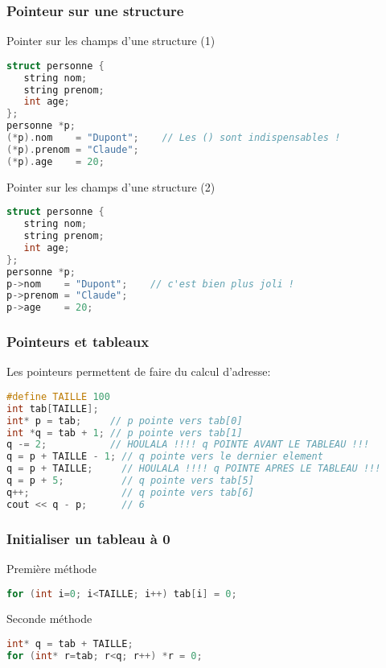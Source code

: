\documentclass{beamer}
\begin{document}
\begin{frame}[fragile=singleslide,shrink=20]
\frametitle{Pointeur sur une structure}
\begin{block}{Pointer sur les champs d'une structure (1)}
\begin{lstlisting}[language=c++]
struct personne {
   string nom;
   string prenom;
   int age;
};
personne *p;
(*p).nom    = "Dupont";    // Les () sont indispensables !
(*p).prenom = "Claude";
(*p).age    = 20;
\end{lstlisting}
\end{block}

\begin{block}{Pointer sur les champs d'une structure (2)}
\begin{lstlisting}[language=c++]
struct personne {
   string nom;
   string prenom;
   int age;
};
personne *p;
p->nom    = "Dupont";    // c'est bien plus joli !
p->prenom = "Claude";
p->age    = 20;
\end{lstlisting}
\end{block}
\end{frame}

\begin{frame}[fragile=singleslide,shrink=20]
\frametitle{Pointeurs et tableaux}
Les pointeurs permettent de faire du calcul d'adresse:
\begin{lstlisting}[language=c++]
#define TAILLE 100
int tab[TAILLE];
int* p = tab;     // p pointe vers tab[0]
int *q = tab + 1; // p pointe vers tab[1]
q -= 2;           // HOULALA !!!! q POINTE AVANT LE TABLEAU !!!
q = p + TAILLE - 1; // q pointe vers le dernier element
q = p + TAILLE;     // HOULALA !!!! q POINTE APRES LE TABLEAU !!!
q = p + 5;          // q pointe vers tab[5]
q++;                // q pointe vers tab[6]
cout << q - p;      // 6
\end{lstlisting}
\end{frame}

\begin{frame}[fragile=singleslide,shrink=20]
\frametitle{Initialiser un tableau à 0}
\begin{block}{Première méthode}
\begin{lstlisting}[language=c++]
for (int i=0; i<TAILLE; i++) tab[i] = 0;
\end{lstlisting}
\end{block}
\begin{block}{Seconde méthode}
\begin{lstlisting}[language=c++]
int* q = tab + TAILLE;
for (int* r=tab; r<q; r++) *r = 0;
\end{lstlisting}
\end{block}
\end{frame}
\end{document}
